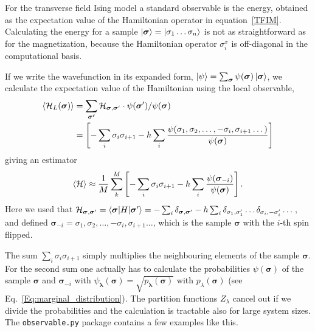 \documentclass[submission, Phys]{SciPost}
\begin{document}
For the transverse field Ising model a standard observable is the energy, obtained as the expectation value of
the Hamiltonian operator in equation~\ref{TFIM}.
Calculating the energy for a sample $\ket{\bm{\sigma} }= \ket{\sigma_1 \dots \sigma_n}$ is not as straightforward as for the magnetization,
because the Hamiltonian operator ${\sigma}^x_i$ is off-diagonal in the computational basis.

If we write the wavefunction in its expanded form, $\ket{\psi} = \sum_{\bm{\sigma}} \psi(\bm{\sigma}) \ket{\bm{\sigma}} $,
we calculate the expectation value of the Hamiltonian using the local observable,
\begin{align}
    \braket{ \mathcal{H}_L({\bm{\sigma}})} & = \sum_{ \bm{\sigma'}} \mathcal{H}_{\bm{\sigma}, \bm{\sigma}'} \cdot \psi(\bm{\sigma}') / \psi(\bm{\sigma})                                                     \\
	                             & =  \left[ -\sum_i \sigma_i \sigma_{i+1} - h \sum_i \frac{\psi(\sigma_1, \sigma_2, \dots , -\sigma_i, \sigma_{i+1} \dots)}{\psi (\bm{\sigma})} \right]
\end{align}
giving an estimator
\begin{equation}
	\braket{ \mathcal{H}} \approx \frac{1}{M} \sum_k^M \left[ -\sum_i \sigma_i \sigma_{i+1} - h \sum_i \frac{\psi (\bm{\sigma}_{-i})}{\psi (\bm{\sigma})} \right].
\end{equation}
Here we used that $\mathcal{H}_{\bm{\sigma}, \bm{\sigma}'} = \braket{\bm{\sigma} | H | \bm{\sigma}'} = -\sum_i \delta_{\bm{\sigma}, \bm{\sigma}'} - h \sum_i \delta_{\sigma_1, \sigma_1'} \dots \delta_{\sigma_i, -\sigma_i'} \dots$, and defined $\bm{\sigma}_{-i} = \sigma_1, \sigma_2, \dots , -\sigma_i, \sigma_{i+1} \dots$, which is the sample $\bm{\sigma}$ with the $i$-th spin flipped.

The sum $\sum_i \sigma_i \sigma_{i+1}$ simply multiplies the neighbouring elements of the sample $\bm{\sigma}$. For the second sum one actually has to calculate the probabilities $\psi (\bm{\sigma})$ of the sample $\bm{\sigma}$ and $\bm{\sigma}_{-i} $ with
$\psi_{\bm{\lambda}}(\bm{\sigma}) = \sqrt{p_{\bm{\lambda}}(\bm{\sigma})}$
with $p_{\lambda}(\bm{\sigma})$ (see Eq.~\ref{Eq:marginal_distribution}). The partition functions $Z_{\lambda}$ cancel out if we divide the probabilities and the calculation is tractable also for large system sizes.
The \verb|observable.py| package contains a few examples like this.
\end{document}

